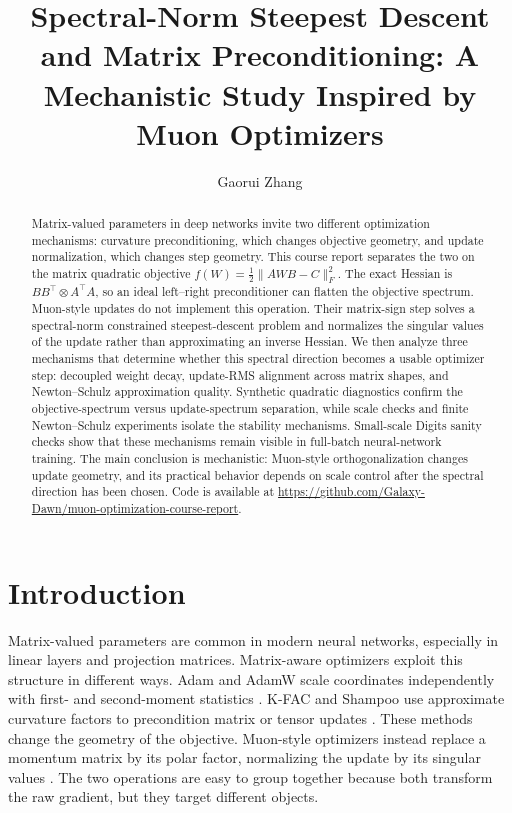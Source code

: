 \documentclass[sigconf,nonacm]{acmart}
\title{Spectral-Norm Steepest Descent and Matrix Preconditioning: A Mechanistic Study Inspired by Muon Optimizers}
\author{Gaorui Zhang}
\affiliation{%
  \institution{Zhejiang University}
  \city{Hangzhou}
  \country{China}}
\begin{document}
\begin{abstract}
Matrix-valued parameters in deep networks invite two different optimization mechanisms: curvature preconditioning, which changes objective geometry, and update normalization, which changes step geometry. This course report separates the two on the matrix quadratic objective $f(W)=\frac{1}{2}\|AWB-C\|_F^2$. The exact Hessian is $BB^\top\otimes A^\top A$, so an ideal left--right preconditioner can flatten the objective spectrum. Muon-style updates do not implement this operation. Their matrix-sign step solves a spectral-norm constrained steepest-descent problem and normalizes the singular values of the update rather than approximating an inverse Hessian. We then analyze three mechanisms that determine whether this spectral direction becomes a usable optimizer step: decoupled weight decay, update-RMS alignment across matrix shapes, and Newton--Schulz approximation quality. Synthetic quadratic diagnostics confirm the objective-spectrum versus update-spectrum separation, while scale checks and finite Newton--Schulz experiments isolate the stability mechanisms. Small-scale Digits sanity checks show that these mechanisms remain visible in full-batch neural-network training. The main conclusion is mechanistic: Muon-style orthogonalization changes update geometry, and its practical behavior depends on scale control after the spectral direction has been chosen. Code is available at \url{https://github.com/Galaxy-Dawn/muon-optimization-course-report}.
\end{abstract}

\maketitle

\section{Introduction}
Matrix-valued parameters are common in modern neural networks, especially in linear layers and projection matrices. Matrix-aware optimizers exploit this structure in different ways. Adam and AdamW scale coordinates independently with first- and second-moment statistics \citep{kingma2014adam,loshchilov2019adamw}. K-FAC and Shampoo use approximate curvature factors to precondition matrix or tensor updates \citep{martens2015kfac,gupta2018shampoo}. These methods change the geometry of the objective. Muon-style optimizers instead replace a momentum matrix by its polar factor, normalizing the update by its singular values \citep{kellerjordan2024muon}. The two operations are easy to group together because both transform the raw gradient, but they target different objects.
\end{document}

